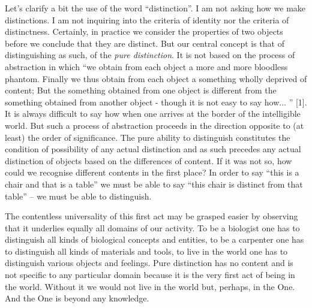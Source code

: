 Let's clarify a bit the use of the word ``distinction''. I am not asking how we make distinctions. I am not inquiring into the criteria of identity nor the criteria of distinctness. Certainly, in practice we consider the properties of two objects before we conclude that they are distinct. But our central concept is that of distinguishing as such, of the {\em pure distinction}. 
It is not based on the process of abstraction in which ``we obtain from each object a more and more bloodless phantom. Finally we thus obtain from each object a something wholly deprived of content; But the something obtained from one object is different from the something obtained from another object - though it is not easy to say how... '' [1]. It is always difficult to say how when one arrives at the border of the intelligible world. But such a process of abstraction proceeds in the direction opposite to (at least) the order of significance. The pure ability to distinguish constitutes the condition of possibility of any actual distinction and as such precedes any actual distinction of objects based on the differences of content. If it was not so, how could we recognise different contents in the first place? In order to say ``this is a chair and that is a table'' we must be able to say ``this chair is distinct from that table'' -- we must be able to distinguish.

The contentless universality of this first act may be grasped easier by observing that it underlies equally all domains of our activity. To be a biologist one has to distinguish all kinds of biological concepts and entities, to be a carpenter one has to distinguish all kinds of materials and tools, to live in the world one has to distinguish various objects and feelings. Pure distinction has no content and is not specific to any particular domain because it is the very first act of being in the world. Without it we would not live in the world but, perhaps, in the One. And the One is beyond any knowledge.

